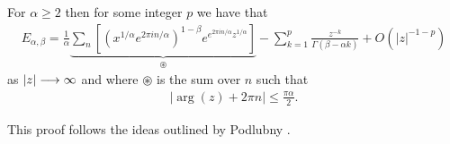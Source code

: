 \begin{lemma}
    For $ \alpha \geq 2 $ then for some integer $ p $ we have that
    \begin{align}
        E_{\alpha, \beta} = \frac{1}{\alpha} \underbrace{\sum_n \left[ \left( x^{1/\alpha} e^{2\pi in / \alpha}\right)^{1-\beta} e^{e^{2 \pi i n / \alpha} z^{1 / \alpha}}\right]}_{\circledast} - \sum_{k=1}^{p} \frac{z^{-k}}{\Gamma(\beta - \alpha k)} + O(|z|^{-1-p})
    \end{align}
    as $ |z| \longrightarrow \infty $ and where $ \circledast $ is the sum over $ n $ such that 
    \begin{align}
        |\arg(z) + 2\pi n| \leq \frac{\pi \alpha}{2}.
    \end{align}
\end{lemma}
This proof follows the ideas outlined by Podlubny \cite{Podlubny1999}.
